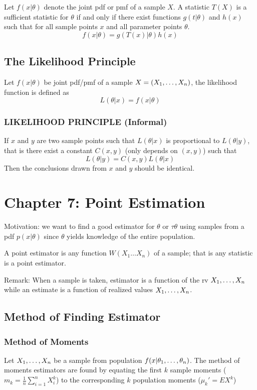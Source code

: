 \documentclass[12pt]{article}
\begin{document}
\begin{theorem}
	Let $f(x|\theta)$ denote the joint pdf or pmf of a sample $X$. A statistic $T(X)$ is a sufficient statistic for $\theta$ if and only if there exist functions $g(t|\theta)$ and $h(x)$ such that for all sample points $x$ and all parameter points $\theta$.
	$$ f(x|\theta) = g(T(x)|\theta) h(x)$$
\end{theorem}

\subsection*{The Likelihood Principle}
\begin{definition}
	Let $f(x|\theta)$ be joint pdf/pmf of a sample $X = (X_1,\ldots, X_n)$, the likelihood function is defined as 
	$$ L(\theta|x) = f(x | \theta) $$
\end{definition}

\subsubsection*{LIKELIHOOD PRINCIPLE (Informal)}
If $x$ and $y$ are two sample points such that $L(\theta|x)$ is proportional to $L(\theta|y)$, that is there exist a constant $C(x, y)$ (only depends on $(x, y)$) such that
$$ L(\theta |y ) = C(x, y) L(\theta |x)$$
Then the conclusions drawn from $x$ and $y$ should be identical.

	
\section*{Chapter 7: Point Estimation}
Motivation: we want to find a good estimator for $\theta$ or $\tau{\theta}$ using samples from a pdf $p(x |\theta)$ since $\theta$ yields knowledge of the entire population.
	
\begin{definition}
	A point estimator is any function $W(X_1 \ldots X_n)$ of a sample; that is any statistic is a point estimator.
\end{definition}
Remark: When a sample is taken, estimator is a function of the rv $X_1,\ldots, X_n$ while an estimate is a function of realized values $X_1,\ldots, X_n$.

\subsection*{Method of Finding Estimator}
\subsubsection{Method of Moments}
\begin{theorem}
	Let $X_1,\ldots, X_n$ be a sample from population $f(x|\theta_1,\ldots, \theta_n)$. The method of moments estimators are found by equating the first $k$ sample moments ($m_k = \frac{1}{n}\sum^n_{i=1}X_i^k$) to the corresponding $k$ population moments ($\mu_k' = EX^k$)
\end{theorem}
\end{document}
